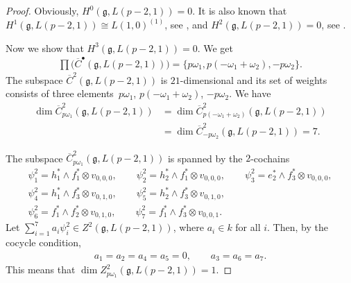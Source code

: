 \documentclass[pdftex]{sigma}%
\numberwithin{equation}{section}
\begin{document}
\begin{proof}
Obviously, $H^0(\mathfrak{g},L(p-2,1))=0$. It is also known that $H^1(\mathfrak{g},L(p-2,1))\cong L(1,0)^{(1)}$, see \cite[p.~301]{Jan91}, and $H^2(\mathfrak{g},L(p-2,1))=0$, see \cite[Theorem~1.1]{DI02}.

Now we show that $H^3(\mathfrak{g},L(p-2,1))=0$. We get
\begin{gather*}
\prod\big(\overline{C}^{\bullet}(\mathfrak{g},L(p-2,1))\big)=\{p\omega_1, p(-\omega_1+\omega_2), -p\omega_2\}.
\end{gather*}
The subspace $\overline{C}^2(\mathfrak{g},L(p-2,1))$ is $21$-dimensional and its set of weights consists of three ele\-ments~$p\omega_1$, $p(-\omega_1+\omega_2)$, $-p\omega_2$. We have
\begin{align*}
\dim \overline{C}^2_{p\omega_1}(\mathfrak{g},L(p-2,1))
&=\dim \overline{C}^2_{p(-\omega_1+\omega_2)}(\mathfrak{g},L(p-2,1))
\\
&=\dim \overline{C}^2_{-p\omega_2}(\mathfrak{g},L(p-2,1))=7.
\end{align*}

The subspace $\overline{C}^2_{p\omega_1}(\mathfrak{g},L(p-2,1))$ is spanned by the $2$-cochains
\begin{gather*}
\psi_1^2=h_1^*\wedge f_1^*\otimes v_{0,0,0},\qquad
\psi_2^2=h_2^*\wedge f_1^*\otimes v_{0,0,0},\qquad
\psi_3^2=e_2^*\wedge f_3^*\otimes v_{0,0,0},
\\
\psi_4^2=h_1^*\wedge f_3^*\otimes v_{0,1,0},\qquad
\psi_5^2=h_2^*\wedge f_3^*\otimes v_{0,1,0},
\\
\psi_6^2=f_1^*\wedge f_2^*\otimes v_{0,1,0},\qquad
\psi_7^2=f_1^*\wedge f_3^*\otimes v_{0,0,1}.
\end{gather*}
Let $\sum_{i=1}^7a_i\psi_i^2\in Z^2(\mathfrak{g},L(p-2,1))$, where $a_i\in k$ for all $i$. Then, by the cocycle condition,
\begin{gather*}
a_1=a_2=a_4=a_5=0,\qquad
a_3=a_6=a_7.
\end{gather*}
This means that $\dim Z^2_{p\omega_1}(\mathfrak{g},L(p-2,1))=1$.


\end{proof}
\end{document}
